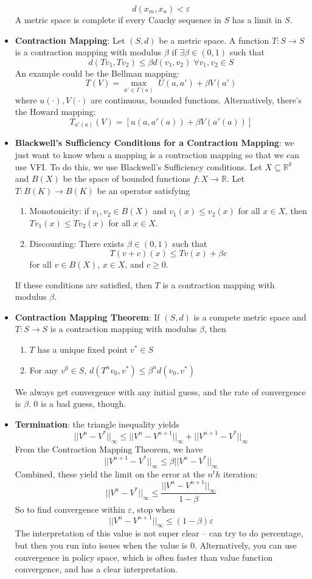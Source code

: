 \documentclass[12pt]{article}
\begin{document}
\begin{itemize}
    \[d(x_m,x_n) < \varepsilon\]
    A metric space is complete if every Cauchy sequence in $S$ has a limit in $S$. 
    \item \textbf{Contraction Mapping}: Let $(S,d)$ be a metric space. A function $T:S\to S$ is a contraction mapping with modulus $\beta$ if $\exists \beta \in (0,1)$ such that 
    \[d(Tv_1, Tv_2) \leq \beta d(v_1,v_2)\; \forall v_1,v_2 \in S\]
    An example could be the Bellman mapping:
    \[T(V) = \max_{a'\in\Gamma(a)}\;U(a,a') + \beta V(a')\]
    where $u(\cdot),V(\cdot)$ are continuous, bounded functions. Alternatively, there's the Howard mapping:
    \[T_{a'(a)}(V) = [u(a,a'(a)) + \beta V(a'(a))]\]
    \item \textbf{Blackwell's Sufficiency Conditions for a Contraction Mapping}: we just want to know when a mapping is a contraction mapping so that we can use VFI. To do this, we use Blackwell's Sufficiency conditions. Let $X \subseteq \mathds{R}^k$ and $B(X)$ be the space of bounded functions $f:X\to \mathds{R}$. Let $T:B(K) \to B(K)$ be an operator satisfying 
    \begin{enumerate}
        \item Monotonicity: if $v_1,v_2\in B(X)$ and $v_1(x) \leq v_2(x)$ for all $x\in X$, then $Tv_1(x) \leq Tv_2(x)$ for all $x\in X$.
        \item Discounting: There exists $\beta \in (0,1)$ such that 
        \[T(v+c)(x) \leq Tv(x) + \beta c\]
        for all $v \in B(X)$, $x\in X$, and $c \geq 0$.
    \end{enumerate}
    If these conditions are satisfied, then $T$ is a contraction mapping with modulus $\beta$.
    \item \textbf{Contraction Mapping Theorem}: If $(S,d)$ is a compete metric space and $T:S\to S$ is a contraction mapping with modulus $\beta$, then
    \begin{enumerate}
        \item $T$ has a unique fixed point $v^* \in S$
        \item For any $v^0 \in S$, $d(T^nv_0,v^*)\leq \beta^nd(v_0,v^*)$
    \end{enumerate}
    We always get convergence with any initial guess, and the rate of convergence is $\beta$. 0 is a bad guess, though.
    \item \textbf{Termination}: the triangle inequality yields
    \[||V^n - V^*||_{\infty} \leq ||V^n - V^{n+1}||_{\infty} + ||V^{n+1} - V^*||_{\infty}\]
    From the Contraction Mapping Theorem, we have
    \[||V^{n+1} -V^*||_{\infty} \leq \beta ||V^n-V^*||_{\infty}\]
    Combined, these yield the limit on the error at the $n^th$ iteration:
    \[||V^n - V^*||_{\infty} \leq \frac{||V^n-V^{n+1}||_{\infty}}{1-\beta}\]
    So to find convergence within $\varepsilon$, stop when 
    \[||V^n-V^{n+1}||_{\infty} \leq (1-\beta)\varepsilon\]
    The interpretation of this value is not super clear -- can try to do percentage, but then you run into issues when the value is 0. Alternatively, you can use convergence in policy space, which is often faster than value function convergence, and has a clear interpretation.
\end{itemize} 
\end{document}

